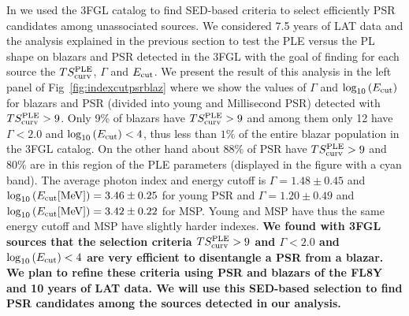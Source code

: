 \documentclass[12pt,twoside,letterpaper,onecolumn,english]{article}
\begin{document}
In \cite{Fermi-LAT:2017yoi} we used the 3FGL catalog to find SED-based criteria to select efficiently PSR candidates among unassociated sources.
We considered 7.5 years of LAT data and the analysis explained in the previous section to test the PLE versus the PL shape on blazars and PSR detected in the 3FGL with the goal of finding for each source the $TS^{\rm{PLE}}_{\rm{curv}}$, $\Gamma$ and $E_{\rm{cut}}$.
We present the result of this analysis in the left panel of Fig~\ref{fig:indexcutpsrblaz} where we show the values of $\Gamma$ and $\log_{10}{(E_{\rm{cut}})}$ for blazars and PSR (divided into young and Millisecond PSR) detected with $TS^{\rm{PLE}}_{\rm{curv}}>9$.
Only 9\% of blazars have $TS^{\rm{PLE}}_{\rm{curv}}>9$ and among them only 12 have $\Gamma<2.0$ and $\log_{10}{(E_{\rm{cut}})}<4$, thus less than $1\%$ of the entire blazar population in the 3FGL catalog.
On the other hand about 88\% of PSR have $TS^{\rm{PLE}}_{\rm{curv}}>9$ and 80\% are in this region of the PLE parameters (displayed in the figure with a cyan band). 
The average photon index and energy cutoff is $\Gamma=1.48\pm 0.45$ and $\log_{10}{(E_{\rm{cut}}[\rm{MeV}])}=3.46\pm0.25$ for young PSR and $\Gamma=1.20\pm 0.49$ and $\log_{10}{(E_{\rm{cut}}[\rm{MeV}])}=3.42\pm0.22$ for MSP. Young and MSP have thus the same energy cutoff and MSP have slightly harder indexes.
{\bf We found with 3FGL sources that the selection criteria $TS^{\rm{PLE}}_{\rm{curv}}>9$ and $\Gamma<2.0$ and $\log_{10}{(E_{\rm{cut}})}<4$ are very efficient to disentangle a PSR from a blazar. 
We plan to refine these criteria using PSR and blazars of the FL8Y and 10 years of LAT data.
We will use this SED-based selection to find PSR candidates among the sources detected in our analysis.}
\end{document}
